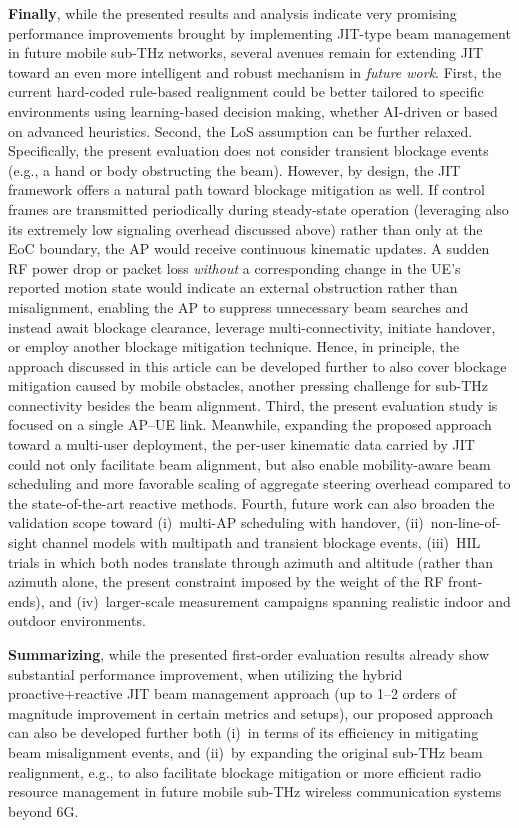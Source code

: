\documentclass[fleqn,10pt]{wlscirep}
\newcommand{\rev}[1]{{\color{revblue}#1}}
\begin{document}
\textbf{Finally}, while the presented results and analysis indicate very promising performance improvements brought by implementing JIT-type beam management in future mobile sub-THz networks, several avenues remain for extending JIT toward an even more intelligent and robust mechanism in \emph{future work}. First, the current hard-coded rule-based realignment could be better tailored to specific environments using learning-based decision making\cite{10036372}, whether AI-driven or based on advanced heuristics. Second, the LoS assumption can be further relaxed. Specifically, the present evaluation does not consider transient blockage events (e.g., a hand or body obstructing the beam). However, by design, the JIT framework offers a natural path toward blockage mitigation as well. If control frames are transmitted periodically during steady-state operation (leveraging also its extremely low signaling overhead discussed above) rather than only at the EoC boundary, the AP would receive continuous kinematic updates. A sudden RF power drop or packet loss \emph{without} a corresponding change in the UE's reported motion state would indicate an external obstruction rather than misalignment, enabling the AP to suppress unnecessary beam searches and instead await blockage clearance, leverage multi-connectivity, initiate handover, or employ another blockage mitigation technique. Hence, in principle, the approach discussed in this article can be developed further to also cover blockage mitigation caused by mobile obstacles, another pressing challenge for sub-THz connectivity besides the beam alignment. Third, the present evaluation study is focused on a single AP--UE link. Meanwhile, expanding the proposed approach toward a multi-user deployment, the per-user kinematic data carried by JIT could not only facilitate beam alignment, but also enable mobility-aware beam scheduling and more favorable scaling of aggregate steering overhead compared to the state-of-the-art reactive methods. \rev{Fourth, future work can also broaden the validation scope toward (i)~multi-AP scheduling with handover, (ii)~non-line-of-sight channel models with multipath and transient blockage events, (iii)~HIL trials in which both nodes translate through azimuth and altitude (rather than azimuth alone, the present constraint imposed by the weight of the RF front-ends), and (iv)~larger-scale measurement campaigns spanning realistic indoor and outdoor environments.}

\textbf{Summarizing}, while the presented first-order evaluation results already show substantial performance improvement, when utilizing the hybrid proactive+reactive JIT beam management approach (up to 1--2 orders of magnitude improvement in certain metrics and setups), our proposed approach can also be developed further both (i)~in terms of its efficiency in mitigating beam misalignment events, and (ii)~by expanding the original sub-THz beam realignment, e.g., to also facilitate blockage mitigation or more efficient radio resource management in future mobile sub-THz wireless communication systems beyond 6G.
\end{document}
